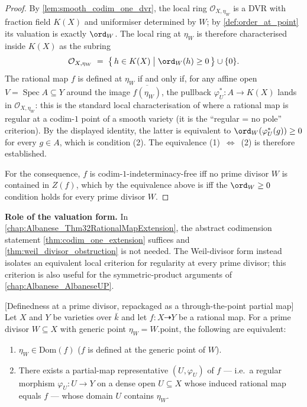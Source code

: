\begin{proof}

  By \cref{lem:smooth_codim_one_dvr}, the local ring \(\mathcal O_{X, \eta_W}\) is a
  DVR with fraction field \(K(X)\) and uniformiser determined by \(W\); by
  \cref{def:order_at_point} its valuation is exactly \(\ord_W\). The local ring at
  \(\eta_W\) is therefore characterised inside \(K(X)\) as the subring
  \[
    \mathcal O_{X, \eta_W} \;=\; \bigl\{\, h \in K(X) \;\big|\; \ord_W(h) \geq 0
    \,\bigr\} \cup \{0\}.
  \]
  The rational map \(f\) is defined at \(\eta_W\) if and only if, for any affine open
  \(V = \operatorname{Spec} A \subseteq Y\) around the image \(\overline{f(\eta_W)}\),
  the pullback \(\varphi_U^\ast \colon A \to K(X)\) lands in
  \(\mathcal O_{X, \eta_W}\): this is the standard local characterisation of where a
  rational map is regular at a codim-\(1\) point of a smooth variety (it is the
  ``regular = no pole'' criterion). By the displayed identity, the latter is
  equivalent to \(\ord_W(\varphi_U^\ast(g)) \geq 0\) for every \(g \in A\), which is
  condition (2). The equivalence (1)~\(\Leftrightarrow\)~(2) is therefore established.

  For the consequence, \(f\) is codim-\(1\)-indeterminacy-free iff no prime divisor \(W\) is
  contained in \(Z(f)\), which by the equivalence above is iff the \(\ord_W \geq 0\)
  condition holds for every prime divisor \(W\).
\end{proof}

\begin{remark}
  \label{rmk:weil_obstruction_application}
  \textbf{Role of the valuation form.} In
  \cref{chap:Albanese_Thm32RationalMapExtension}, the abstract codimension statement
  \cref{thm:codim_one_extension} suffices and \cref{thm:weil_divisor_obstruction}
  is not needed. The Weil-divisor form instead isolates an equivalent local
  criterion for regularity at every prime divisor; this criterion is also useful
  for the symmetric-product arguments of \cref{chap:Albanese_AlbaneseUP}.
\end{remark}

\begin{lemma}


  [Definedness at a prime divisor, repackaged as a through-the-point partial map]
  \label{lem:mem_domain_partial_map_reshuffle}
  Let \(X\) and \(Y\) be varieties over \(\bar k\) and let
  \(f \colon X \dashrightarrow Y\) be a rational map. For a prime divisor
  \(W \subseteq X\) with generic point \(\eta_W = W.\mathrm{point}\), the
  following are equivalent:
  \begin{enumerate}
    \item \(\eta_W \in \mathrm{Dom}(f)\) (\(f\) is defined at the generic point of
      \(W\)).
    \item There exists a partial-map representative \((U, \varphi_U)\) of \(f\) ---
      i.e.\ a regular morphism \(\varphi_U \colon U \to Y\) on a dense open
      \(U \subseteq X\) whose induced rational map equals \(f\) --- whose domain
      \(U\) contains \(\eta_W\).
  \end{enumerate}
\end{lemma}

